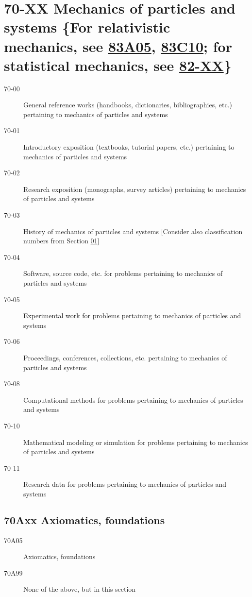 \documentclass[letterpaper]{article}
\begin{document}
\section*{70-XX Mechanics of particles and systems \{For relativistic mechanics, see \hyperref[83A05]{83A05}, \hyperref[83C10]{83C10}; for statistical mechanics, see \hyperref[82-XX]{82-XX}\} }\label{70-XX}
\begin{description}
\item [70-00]\label{70-00} General reference works (handbooks, dictionaries, bibliographies, etc.) pertaining to mechanics of particles and systems
\item [70-01]\label{70-01} Introductory exposition (textbooks, tutorial papers, etc.) pertaining to mechanics of particles and systems
\item [70-02]\label{70-02} Research exposition (monographs, survey articles) pertaining to mechanics of particles and systems
\item [70-03]\label{70-03} History of mechanics of particles and systems [Consider also classification numbers from Section \hyperref[01-XX]{01}]
\item [70-04]\label{70-04} Software, source code, etc. for problems pertaining to mechanics of particles and systems
\item [70-05]\label{70-05} Experimental work for problems pertaining to mechanics of particles and systems
\item [70-06]\label{70-06} Proceedings, conferences, collections, etc. pertaining to mechanics of particles and systems
\item [70-08]\label{70-08} Computational methods for problems pertaining to mechanics of particles and systems
\item [70-10]\label{70-10} Mathematical modeling or simulation for problems pertaining to mechanics of particles and systems
\item [70-11]\label{70-11} Research data for problems pertaining to mechanics of particles and systems
\end{description}
\subsection*{70Axx  Axiomatics, foundations }\label{70Axx}
\begin{description}  
\item [70A05]\label{70A05} Axiomatics, foundations
\item [70A99]\label{70A99} None of the above, but in this section
\end{description}
\end{document}
